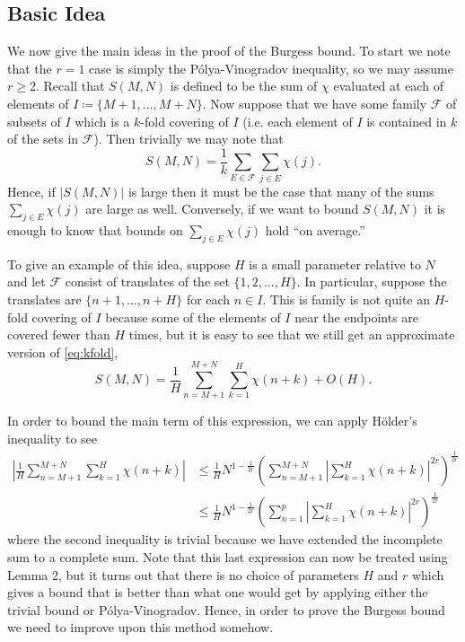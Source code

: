 \documentclass[a4paper,11pt,twoside]{amsart}
\begin{document}
\subsection{Basic Idea}
We now give the main ideas in the proof of the Burgess bound. To start we note that the $r = 1$ case is simply the P\'{o}lya-Vinogradov inequality, so we may assume $r \geq 2$. Recall that $S(M,N)$ is defined to be the sum of $\chi$ evaluated at each of elements of $I \coloneqq \{M+1, \ldots, M+N\}$. Now suppose that we have some family $\mathcal{F}$ of subsets of $I$ which is a $k$-fold covering of $I$ (i.e. each element of $I$ is contained in $k$ of the sets in $\mathcal{F}$). Then trivially we may note that
\begin{equation} \label{eq:kfold}
S(M, N) = \frac{1}{k} \sum_{E \in \mathcal{F}} \sum_{j \in E} \chi(j).
\end{equation}
Hence, if $|S(M,N)|$ is large then it must be the case that many of the sums $\sum_{j \in E} \chi(j)$ are large as well. Conversely, if we want to bound $S(M, N)$ it is enough to know that bounds on $\sum_{j \in E} \chi(j)$ hold ``on average.''

To give an example of this idea, suppose $H$ is a small parameter relative to $N$ and let $\mathcal{F}$ consist of translates of the set $\{1,2, \ldots, H\}$. In particular, suppose the translates are $\{n + 1, \ldots, n+H\}$ for each $n \in I$. This is family is not quite an $H$-fold covering of $I$ because some of the elements of $I$ near the endpoints are covered fewer than $H$ times, but it is easy to see that we still get an approximate version of \eqref{eq:kfold},
\[
S(M, N) = \frac{1}{H} \sum_{n = M+1}^{M+N} \sum_{k = 1}^H \chi(n + k) + O(H).
\]

In order to bound the main term of this expression, we can apply H\"{o}lder's inequality to see
\begin{align}
\left| \frac{1}{H} \sum_{n = M+1}^{M+N} \sum_{k = 1}^H \chi(n + k)\right| &\leq \frac{1}{H} N^{1-\frac{1}{2r}} \left( \sum_{n = M+1}^{M+N} \left| \sum_{k = 1}^H \chi(n + k) \right|^{2r} \right)^\frac{1}{2r}  \label{eq:naivebd}\\
&\leq \frac{1}{H} N^{1-\frac{1}{2r}} \left( \sum_{n=1}^{p} \left| \sum_{k = 1}^H \chi(n + k) \right|^{2r} \right)^\frac{1}{2r}
\end{align}
where the second inequality is trivial because we have extended the incomplete sum to a complete sum. Note that this last expression can now be treated using Lemma 2, but it turns out that there is no choice of parameters $H$ and $r$ which gives a bound that is better than what one would get by applying either the trivial bound or P\'{o}lya-Vinogradov. Hence, in order to prove the Burgess bound we need to improve upon this method somehow.
\end{document}
